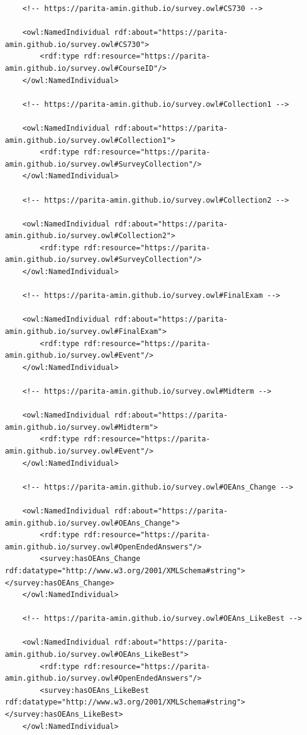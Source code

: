 \begin{lstlisting}
    <!-- https://parita-amin.github.io/survey.owl#CS730 -->

    <owl:NamedIndividual rdf:about="https://parita-amin.github.io/survey.owl#CS730">
        <rdf:type rdf:resource="https://parita-amin.github.io/survey.owl#CourseID"/>
    </owl:NamedIndividual>
    
    <!-- https://parita-amin.github.io/survey.owl#Collection1 -->

    <owl:NamedIndividual rdf:about="https://parita-amin.github.io/survey.owl#Collection1">
        <rdf:type rdf:resource="https://parita-amin.github.io/survey.owl#SurveyCollection"/>
    </owl:NamedIndividual>
    
    <!-- https://parita-amin.github.io/survey.owl#Collection2 -->

    <owl:NamedIndividual rdf:about="https://parita-amin.github.io/survey.owl#Collection2">
        <rdf:type rdf:resource="https://parita-amin.github.io/survey.owl#SurveyCollection"/>
    </owl:NamedIndividual>
    
    <!-- https://parita-amin.github.io/survey.owl#FinalExam -->

    <owl:NamedIndividual rdf:about="https://parita-amin.github.io/survey.owl#FinalExam">
        <rdf:type rdf:resource="https://parita-amin.github.io/survey.owl#Event"/>
    </owl:NamedIndividual>
    
    <!-- https://parita-amin.github.io/survey.owl#Midterm -->

    <owl:NamedIndividual rdf:about="https://parita-amin.github.io/survey.owl#Midterm">
        <rdf:type rdf:resource="https://parita-amin.github.io/survey.owl#Event"/>
    </owl:NamedIndividual>
    
    <!-- https://parita-amin.github.io/survey.owl#OEAns_Change -->

    <owl:NamedIndividual rdf:about="https://parita-amin.github.io/survey.owl#OEAns_Change">
        <rdf:type rdf:resource="https://parita-amin.github.io/survey.owl#OpenEndedAnswers"/>
        <survey:hasOEAns_Change rdf:datatype="http://www.w3.org/2001/XMLSchema#string"></survey:hasOEAns_Change>
    </owl:NamedIndividual>
    
    <!-- https://parita-amin.github.io/survey.owl#OEAns_LikeBest -->

    <owl:NamedIndividual rdf:about="https://parita-amin.github.io/survey.owl#OEAns_LikeBest">
        <rdf:type rdf:resource="https://parita-amin.github.io/survey.owl#OpenEndedAnswers"/>
        <survey:hasOEAns_LikeBest rdf:datatype="http://www.w3.org/2001/XMLSchema#string"></survey:hasOEAns_LikeBest>
    </owl:NamedIndividual>
    

\end{lstlisting}
